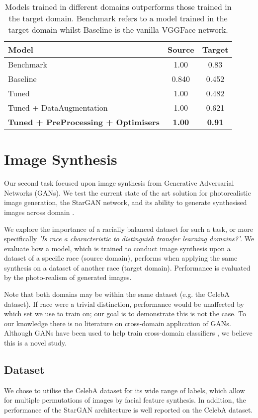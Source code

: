 \documentclass[10pt,twocolumn,letterpaper]{article}
\begin{document}
\begin{table}[ht]
\begin{center}
\begin{tabular}{|l|c|c|}
\hline 
Model& Source & Target\\ \hline
Benchmark &1.00 &0.83  \\ \hline
Baseline &{0.840}&{0.452} \\ \hline
Tuned &{1.00}&{0.482} \\ \hline 
Tuned + DataAugmentation&1.00&0.621 \\ \hline
\textbf{Tuned + PreProcessing + Optimisers}& \textbf{1.00} & \textbf{0.91} \\ \hline
\end{tabular}
\end{center}
\caption{Models trained in different domains outperforms those trained in the target domain. Benchmark refers to a model trained in the target domain whilst Baseline is the vanilla VGGFace network. \label{final}}
\end{table}

\section{Image Synthesis}
Our second task focused upon image synthesis from Generative Adversarial Networks (GANs). We test the current state of the art solution for photorealistic image generation, the StarGAN network, and its ability to generate synthesised images across domain \cite{Choi:2017aa}. 

We explore the importance of a racially balanced dataset for such a task, or more specifically \textit{'Is race a characteristic to distinguish transfer learning domains?'}. We evaluate how a model, which is trained to conduct image synthesis upon a dataset of a specific race (source domain), performs when applying the same synthesis on a dataset of another race (target domain). Performance is evaluated by the photo-realism of generated images. 

Note that both domains may be within the same dataset (e.g. the CelebA dataset). If race were a trivial distinction, performance would be unaffected by which set we use to train on; our goal is to demonstrate this is not the case. To our knowledge there is no literature on cross-domain application of GANs. Although GANs have been used to help train cross-domain classifiers \cite{Yoon:2017aa}, we believe this is a novel study.

\subsection{Dataset}
We chose to utilise the CelebA dataset for its wide range of labels, which allow for multiple permutations of images by facial feature synthesis. In addition, the performance of the StarGAN architecture is well reported on the CelebA dataset. 
\end{document}
